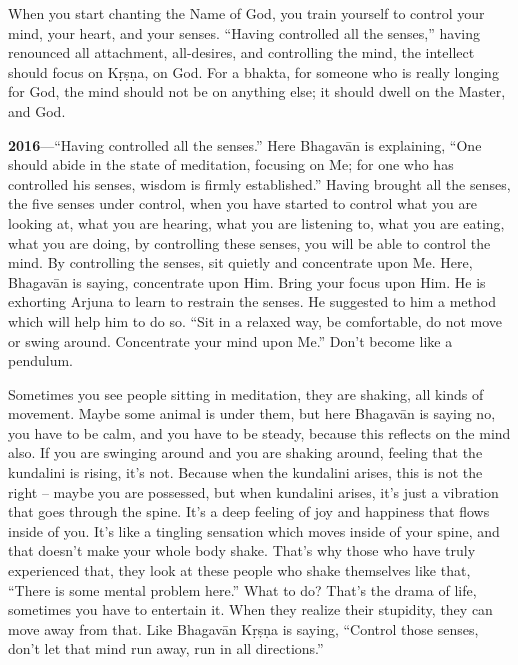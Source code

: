 When you start chanting the Name of God, you train yourself to control your mind, your heart, and your senses. “Having controlled all the senses,” having renounced all attachment, all-desires, and controlling the mind, the intellect should focus on Kṛṣṇa, on God. For a bhakta, for someone who is really longing for God, the mind should not be on anything else; it should dwell on the Master, and God.

\textbf{2016}---“Having controlled all the senses.” Here Bhagavān is explaining, “One should abide in the state of meditation, focusing on Me; for one who has controlled his senses, wisdom is firmly established.” Having brought all the senses, the five senses under control, when you have started to control what you are looking at, what you are hearing, what you are listening to, what you are eating, what you are doing, by controlling these senses, you will be able to control the mind. By controlling the senses, sit quietly and concentrate upon Me. Here, Bhagavān is saying, concentrate upon Him. Bring your focus upon Him. He is exhorting Arjuna to learn to restrain the senses. He suggested to him a method which will help him to do so. “Sit in a relaxed way, be comfortable, do not move or swing around. Concentrate your mind upon Me.” Don’t become like a pendulum.

Sometimes you see people sitting in meditation, they are shaking, all kinds of movement. Maybe some animal is under them, but here Bhagavān is saying no, you have to be calm, and you have to be steady, because this reflects on the mind also. If you are swinging around and you are shaking around, feeling that the kundalini is rising, it’s not. Because when the kundalini arises, this is not the right – maybe you are possessed, but when kundalini arises, it’s just a vibration that goes through the spine. It’s a deep feeling of joy and happiness that flows inside of you. It’s like a tingling sensation which moves inside of your spine, and that doesn’t make your whole body shake. That’s why those who have truly experienced that, they look at these people who shake themselves like that, “There is some mental problem here.” What to do? That’s the drama of life, sometimes you have to entertain it. When they realize their stupidity, they can move away from that. Like Bhagavān Kṛṣṇa is saying, “Control those senses, don’t let that mind run away, run in all directions.”

